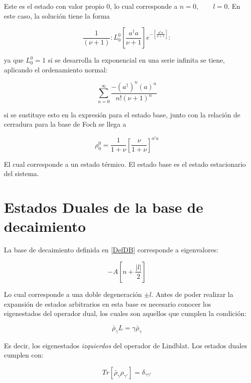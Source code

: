 \documentclass[a4paper,10pt]{report}
\begin{document}
Este es el estado con valor propio 0, lo cual corresponde a $n=0, \qquad l=0$. En este caso, la solución tiene la forma

\begin{equation}
\frac{1}{(\nu+1)}:L_0^0[\frac{a^\dagger a}{\nu+1}]e^{-[\frac{a^\dagger a}{\nu+1}]}:
\end{equation}

ya que $L_0^0 = 1$ \cite{ArfkenMM} si se desarrolla la exponencial en una serie infinita se tiene, aplicando el ordenamiento normal:

\begin{equation}
\sum_{n=0}^\infty \frac{-(a^\dagger)^n (a)^n}{n!(\nu+1)^n}
\end{equation}

si se sustituye esto en la expresión para el estado base, junto con la relación de cerradura para la base de Foch se llega a \cite{EnglertDB}

\begin{equation}
\rho_0^0 = \frac{1}{1+\nu} [\frac{\nu}{1+\nu}]^{a^\dagger a}
\end{equation}

El cual corresponde a un estado térmico. El estado base es el estado estacionario del sistema.

\section{Estados Duales de la base de decaimiento}

La base de decaimiento \cite{EnglertDB} definida en \ref{DefDB} corresponde a eigenvalores:

\begin{equation}
 -A[n+\frac{|l|}{2}]
\end{equation}

Lo cual corresponde a una doble degeneración $\pm l$. Antes de poder realizar la expansión de estados arbitrarios en esta base es necesario conocer los eigenestados del operador dual, los cuales son aquellos que cumplen la condición\cite{EnglertDB}:

\begin{equation}
\bar{\rho}_\gamma L = \gamma\bar{\rho}_\gamma
\end{equation}

Es decir, los eigenestados \textit{izquierdos} del operador de Lindblat. Los estados duales cumplen con:

\begin{equation}
Tr[\bar{\rho}_{\gamma}\rho_{\gamma'}] = \delta_{\gamma\gamma'}
\end{equation}
\end{document}
